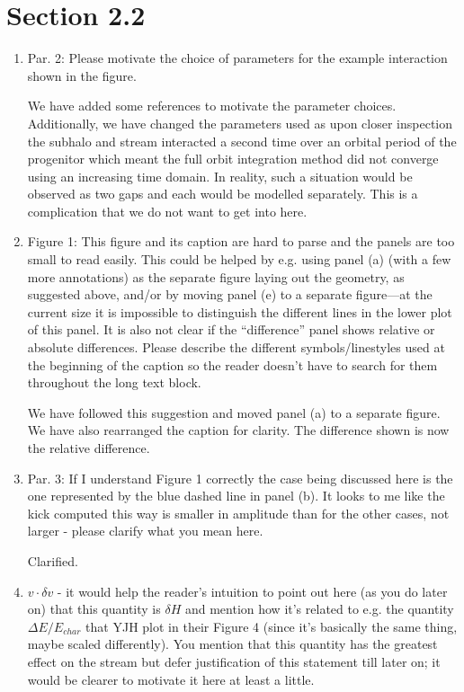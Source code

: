 \documentclass{article}
\begin{document}
\section{Section 2.2}
\begin{enumerate}
\item Par. 2: Please motivate the choice of parameters for the example interaction shown in
the figure.

{\color{red} We have added some references to motivate the parameter choices. Additionally, we have changed the parameters used as upon closer inspection the subhalo and stream interacted a second time over an orbital period of the progenitor which meant the full orbit integration method did not converge using an increasing time domain. In reality, such a situation would be observed as two gaps and each would be modelled separately. This is a complication that we do not want to get into here.}

\item Figure 1: This figure and its caption are hard to parse and the panels are too small to
read easily. This could be helped by e.g. using panel (a) (with a few more annotations)
as the separate figure laying out the geometry, as suggested above, and/or by moving
panel (e) to a separate figure—at the current size it is impossible to distinguish the
different lines in the lower plot of this panel. It is also not clear if the “difference” panel
shows relative or absolute differences. Please describe the different symbols/linestyles
used at the beginning of the caption so the reader doesn’t have to search for them
throughout the long text block.

{\color{red} We have followed this suggestion and moved panel (a) to a separate figure. We have also rearranged the caption for clarity. The difference shown is now the relative difference.}

\item Par. 3: If I understand Figure 1 correctly the case being discussed here is the one
represented by the blue dashed line in panel (b). It looks to me like the kick computed
this way is smaller in amplitude than for the other cases, not larger - please clarify what
you mean here.

{\color{red} Clarified.}

\item $v \cdot \delta v$ - it would help the reader’s intuition to point out here (as you do later on)
that this quantity is $\delta H$ and mention how it’s related to e.g. the quantity $\Delta
E/E_{char}$ that YJH plot in their Figure 4 (since it’s basically the same thing, maybe
scaled differently). You mention that this quantity has the greatest effect on the stream
but defer justification of this statement till later on; it would be clearer to motivate it here
at least a little.


\end{enumerate}
\end{document}
